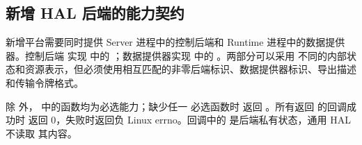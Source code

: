 \documentclass[../dayan_api_reference.tex]{subfiles}
\begin{document}
\subsection{新增 HAL 后端的能力契约}

新增平台需要同时提供 Server 进程中的控制后端和 Runtime 进程中的数据提供器。控制后端
实现  中的 ；数据提供器实现
 中的 。两部分可以采用
不同的内部状态和资源表示，但必须使用相互匹配的非零后端标识、数据提供器标识、导出描述
和传输令牌格式。

除  外， 中的函数均为必选能力；缺少任一
必选函数时  返回 。所有返回  的回调成功时
返回 0，失败时返回负 Linux errno。回调中的  是后端私有状态，通用 HAL 不读取
其内容。
\end{document}
